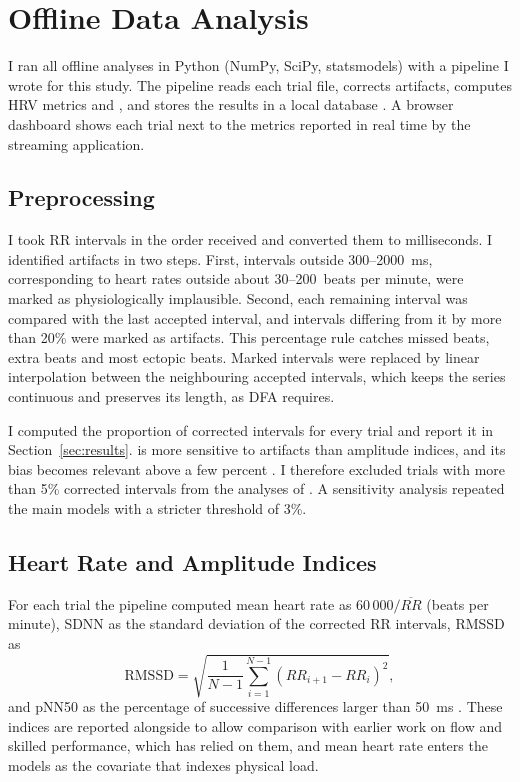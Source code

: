 \section{Offline Data Analysis}
\label{sec:analysis}

I ran all offline analyses in Python (NumPy, SciPy, statsmodels) with a pipeline I wrote for this study. The pipeline reads each trial file, corrects artifacts, computes HRV metrics and \al, and stores the results in a local database . A browser dashboard shows each trial next to the metrics reported in real time by the streaming application.

\subsection{Preprocessing}
\label{sec:preprocessing}

I took RR intervals in the order received and converted them to milliseconds. I identified artifacts in two steps. First, intervals outside 300--2000~ms, corresponding to heart rates outside about 30--200~beats per minute, were marked as physiologically implausible. Second, each remaining interval was compared with the last accepted interval, and intervals differing from it by more than 20\% were marked as artifacts. This percentage rule catches missed beats, extra beats and most ectopic beats. Marked intervals were replaced by linear interpolation between the neighbouring accepted intervals, which keeps the series continuous and preserves its length, as DFA requires.

I computed the proportion of corrected intervals for every trial and report it in Section~\ref{sec:results}. \al{} is more sensitive to artifacts than amplitude indices, and its bias becomes relevant above a few percent \citep{rogers2022update}. I therefore excluded trials with more than 5\% corrected intervals from the analyses of \al{} . A sensitivity analysis repeated the main models with a stricter threshold of 3\%.

\subsection{Heart Rate and Amplitude Indices}
\label{sec:hrv-metrics}

For each trial the pipeline computed mean heart rate as $60\,000/\overline{RR}$ (beats per minute), SDNN as the standard deviation of the corrected RR intervals, RMSSD as
\begin{equation}
\mathrm{RMSSD} = \sqrt{\frac{1}{N-1}\sum_{i=1}^{N-1} \left( RR_{i+1} - RR_i \right)^2},
\end{equation}
and pNN50 as the percentage of successive differences larger than 50~ms \citep{taskforce1996}. These indices are reported alongside \al{} to allow comparison with earlier work on flow and skilled performance, which has relied on them, and mean heart rate enters the models as the covariate that indexes physical load.

